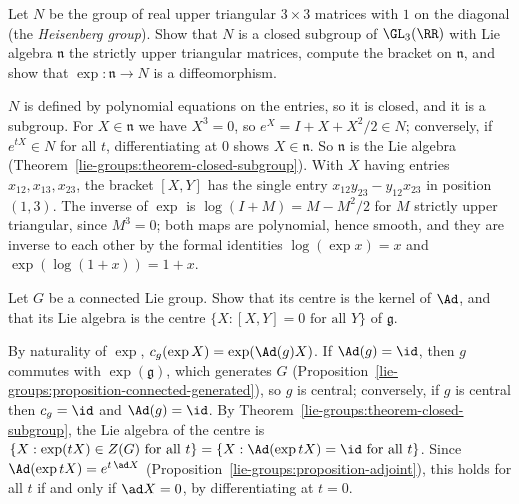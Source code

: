 \begin{exercise}\label{lie-groups:exercise-heisenberg}
Let $N$ be the group of real upper triangular $3 \times 3$ matrices with $1$ on the diagonal (the \emph{Heisenberg group}). Show that $N$ is a closed subgroup
of $\GL_3(\RR)$ with Lie algebra $\mathfrak{n}$ the strictly upper triangular matrices, compute the bracket on $\mathfrak{n}$, and show that
$\exp \colon \mathfrak{n} \to N$ is a diffeomorphism.
\end{exercise}

\begin{solution}
$N$ is defined by polynomial equations on the entries, so it is closed, and it is a subgroup. For $X \in \mathfrak{n}$ we have $X^3 = 0$, so
$e^X = I + X + X^2/2 \in N$; conversely, if $e^{tX} \in N$ for all $t$, differentiating at $0$ shows $X \in \mathfrak{n}$. So $\mathfrak{n}$ is the Lie algebra
(Theorem~\ref{lie-groups:theorem-closed-subgroup}). With $X$ having entries $x_{12}, x_{13}, x_{23}$, the bracket $[X, Y]$ has the single entry
$x_{12}y_{23} - y_{12}x_{23}$ in position $(1, 3)$. The inverse of $\exp$ is $\log(I + M) = M - M^2/2$ for $M$ strictly upper triangular, since $M^3 = 0$;
both maps are polynomial, hence smooth, and they are inverse to each other by the formal identities $\log(\exp x) = x$ and $\exp(\log(1 + x)) = 1 + x$.
\end{solution}

\begin{exercise}\label{lie-groups:exercise-centre}
Let $G$ be a connected Lie group. Show that its centre is the kernel of $\Ad$, and that its Lie algebra is the centre
$\{X : [X, Y] = 0 \text{ for all } Y\}$ of $\mathfrak{g}$.
\end{exercise}

\begin{solution}
By naturality of $\exp$, $c_g(\exp X) = \exp(\Ad(g)X)$. If $\Ad(g) = \id$, then $g$ commutes with $\exp(\mathfrak{g})$, which generates $G$
(Proposition~\ref{lie-groups:proposition-connected-generated}), so $g$ is central; conversely, if $g$ is central then $c_g = \id$ and $\Ad(g) = \id$. By
Theorem~\ref{lie-groups:theorem-closed-subgroup}, the Lie algebra of the centre is $\{X : \exp(tX) \in Z(G) \text{ for all } t\} = \{X : \Ad(\exp tX) = \id
\text{ for all } t\}$. Since $\Ad(\exp tX) = e^{t\,\ad X}$ (Proposition~\ref{lie-groups:proposition-adjoint}), this holds for all $t$ if and only if
$\ad X = 0$, by differentiating at $t = 0$.
\end{solution}

